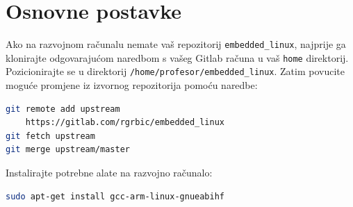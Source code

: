 \documentclass[11pt]{article}
\begin{document}
\section{Osnovne postavke}
Ako na razvojnom računalu nemate vaš repozitorij \texttt{embedded\_linux},
 najprije ga klonirajte odgovarajućom naredbom s vašeg Gitlab računa u vaš
 \texttt{home} direktorij. Pozicionirajte se u direktorij
 \texttt{/home/profesor/embedded\_linux}. Zatim povucite moguće promjene iz
 izvornog repozitorija pomoću naredbe:
\begin{lstlisting}[language=bash]
git remote add upstream
	https://gitlab.com/rgrbic/embedded_linux
git fetch upstream
git merge upstream/master
\end{lstlisting}
Instalirajte potrebne alate na razvojno računalo:
\begin{lstlisting}[language=bash]
sudo apt-get install gcc-arm-linux-gnueabihf
\end{lstlisting}
\end{document}
